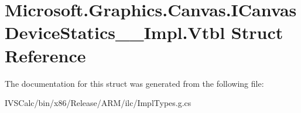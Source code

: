 \hypertarget{struct_microsoft_1_1_graphics_1_1_canvas_1_1_i_canvas_device_statics_____impl_1_1_vtbl}{}\section{Microsoft.\+Graphics.\+Canvas.\+I\+Canvas\+Device\+Statics\+\_\+\+\_\+\+Impl.\+Vtbl Struct Reference}
\label{struct_microsoft_1_1_graphics_1_1_canvas_1_1_i_canvas_device_statics_____impl_1_1_vtbl}


The documentation for this struct was generated from the following file\+:\begin{DoxyCompactItemize}
\item 
I\+V\+S\+Calc/bin/x86/\+Release/\+A\+R\+M/ilc/Impl\+Types.\+g.\+cs\end{DoxyCompactItemize}
